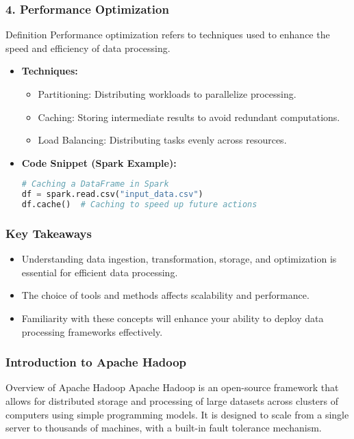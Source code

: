 \documentclass[aspectratio=169]{beamer}
\begin{document}
\begin{frame}[fragile]
    \frametitle{4. Performance Optimization}
    \begin{block}{Definition}
        Performance optimization refers to techniques used to enhance the speed and efficiency of data processing.
    \end{block}
    \begin{itemize}
        \item \textbf{Techniques:}
        \begin{itemize}
            \item Partitioning: Distributing workloads to parallelize processing.
            \item Caching: Storing intermediate results to avoid redundant computations.
            \item Load Balancing: Distributing tasks evenly across resources.
        \end{itemize}
        \item \textbf{Code Snippet (Spark Example):}
        \begin{lstlisting}[language=python]
# Caching a DataFrame in Spark
df = spark.read.csv("input_data.csv")
df.cache()  # Caching to speed up future actions
        \end{lstlisting}
    \end{itemize}
\end{frame}

\begin{frame}[fragile]
    \frametitle{Key Takeaways}
    \begin{itemize}
        \item Understanding data ingestion, transformation, storage, and optimization is essential for efficient data processing.
        \item The choice of tools and methods affects scalability and performance.
        \item Familiarity with these concepts will enhance your ability to deploy data processing frameworks effectively.
    \end{itemize}
\end{frame}

\begin{frame}[fragile]
    \frametitle{Introduction to Apache Hadoop}
    \begin{block}{Overview of Apache Hadoop}
        Apache Hadoop is an open-source framework that allows for distributed storage and processing of large datasets across clusters of computers using simple programming models. It is designed to scale from a single server to thousands of machines, with a built-in fault tolerance mechanism.
    \end{block}
\end{frame}
\end{document}
